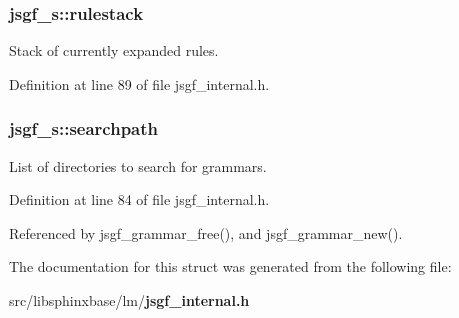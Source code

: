\subsubsection[{rulestack}]{ jsgf\+\_\+s\+::rulestack}\label{structjsgf__s_a0980112df6f2f591e64158266eb04b69}


Stack of currently expanded rules. 



Definition at line 89 of file jsgf\+\_\+internal.\+h.

\subsubsection[{searchpath}]{ jsgf\+\_\+s\+::searchpath}\label{structjsgf__s_aabb207f0909c661a831e5f931dd9f60e}


List of directories to search for grammars. 



Definition at line 84 of file jsgf\+\_\+internal.\+h.



Referenced by jsgf\+\_\+grammar\+\_\+free(), and jsgf\+\_\+grammar\+\_\+new().



The documentation for this struct was generated from the following file\+:\begin{DoxyCompactItemize}
\item 
src/libsphinxbase/lm/{\bf jsgf\+\_\+internal.\+h}\end{DoxyCompactItemize}
